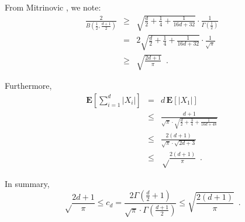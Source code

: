 \documentclass[charterfonts,lotsofwhite]{patmorin}
\newcommand{\E}{\mathbf{E}}
\begin{document}
From Mitrinovic \cite[p.~286]{m70}, we note:
\begin{eqnarray}
\frac{2}{B(\frac{1}{2},\frac{d+1}{2})} & \ge &
  \sqrt{\frac{d}{2}+\frac{1}{4}+\frac{1}{16d+32}}\cdot 
     \frac{1}{\Gamma(\frac{1}{2})} \\
 & = & 2\sqrt{\frac{d}{2}+\frac{1}{4}+\frac{1}{16d+32}}\cdot
      \frac{1}{\sqrt{\pi}} \\
 & \ge & \sqrt{\frac{2d+1}{\pi}} \enspace .
\end{eqnarray}

Furthermore,
\begin{eqnarray*}
\E\left[\sum_{i=1}^d|X_i|\right] & = & d\,\E[|X_1|] \\
  & \le & \frac{d+1}{\sqrt{\pi}\cdot\sqrt{\frac{d}{2}+
                       \frac{3}{4}+\frac{1}{16d+48}}} \\
  & \le & \frac{2(d+1)}{\sqrt{\pi}\cdot\sqrt{2d+3}} \\ 
  & \le & \sqrt\frac{2(d+1)}{\pi} \enspace . 
\end{eqnarray*}

In summary,
\[
\sqrt\frac{2d+1}{\pi} \le c_d = \frac{2\Gamma(\frac{d}{2}+1)}
                            {\sqrt{\pi}\cdot\Gamma(\frac{d+1}{2})}
 \le \sqrt{\frac{2(d+1)}{\pi}} \enspace .
\]
\end{document}
